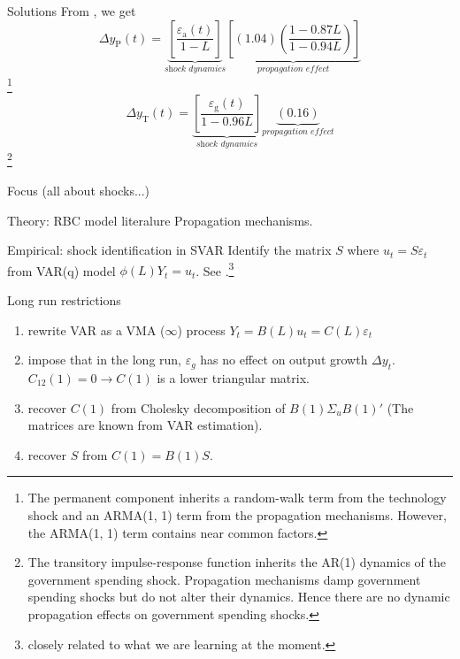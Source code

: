 \documentclass[10pt]{beamer}
\begin{document}
\begin{frame}{Solutions}
    From \cite{christiano_eichenbaum_2020}, we get
    \begin{equation}
        \Delta y_{\mathrm{P}}(t)=\underbrace{\left[\frac{\varepsilon_{\mathrm{a}}(t)}{1-L}\right]}_{\textit{shock dynamics}}\underbrace{\left[(1.04)\left(\frac{1-0.87 L}{1-0.94 L}\right)\right]}_{\textit{propagation effect}}
    \end{equation}\footnote{The permanent component inherits a random-walk term from the technology shock and an ARMA(1, 1) term from the propagation mechanisms. However, the ARMA(1, 1) term contains near common factors.}
    \begin{equation}
        \Delta y_{\mathrm{T}}(t)=\underbrace{\left[\frac{\varepsilon_{\mathrm{g}}(t)}{1-0.96
                    L}\right]}_{\textit{shock dynamics}}\underbrace{(0.16)}_{\textit{propagation
            effect}}
    \end{equation}\footnote{The transitory impulse-response function inherits the AR(1) dynamics of the government spending shock. Propagation mechanisms damp government spending shocks but do not alter their dynamics. Hence there are no dynamic propagation effects on government spending shocks.}
\end{frame}
\begin{frame}{Focus (all about shocks...)}
    \begin{exampleblock}{Theory: RBC model literalure}
        Propagation mechanisms.
    \end{exampleblock}

    \begin{exampleblock}{Empirical: shock identification in SVAR}
        Identify the matrix $S$ where $u_t=S\varepsilon_t$ from VAR(q) model $\phi(L)Y_t=u_t$. See \cite{blanchard_quah_1988}.\footnote{closely related to what we are learning at the moment.}
    \end{exampleblock}
\end{frame}

\begin{frame}{Long run restrictions}
    \begin{enumerate}
        \item rewrite VAR as a VMA ($\infty$) process $Y_t=B(L)u_t=C(L)\varepsilon_t$
        \item impose that in the long run, $\varepsilon_g$ has no effect on output growth
              $\Delta y_t$. $C_{12}(1)=0\rightarrow C(1)$ is a lower triangular matrix.
        \item recover $C(1)$ from Cholesky decomposition of $B(1)\Sigma_u B(1)'$ (The
              matrices are known from VAR estimation).
        \item recover $S$ from $C(1)=B(1)S$.
    \end{enumerate}
\end{frame}
\end{document}
